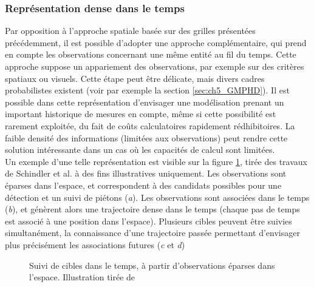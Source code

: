 \subsubsection{Représentation dense dans le temps}
Par opposition à l'approche spatiale basée sur des grilles présentées précédemment, il est possible d'adopter une approche complémentaire, qui prend en compte les observations concernant une même entité au fil du temps. Cette approche suppose un appariement des observations, par exemple sur des critères spatiaux ou visuels. Cette étape peut être délicate, mais divers cadres probabilistes existent (voir par exemple la section \ref{sec:ch5_GMPHD}). Il est possible dans cette représentation d'envisager une modélisation prenant un important historique de mesures en compte, même si cette possibilité est rarement exploitée, du fait de coûts calculatoires rapidement rédhibitoires. La faible densité des informations (limitées aux observations) peut rendre cette solution intéressante dans un cas où les capacités de calcul sont limitées. \\
Un exemple d'une telle représentation est visible sur la figure \ref{fig:ch2_suivi_temps_epars}, tirée des travaux de Schindler et al. \cite{Schindler2010} à des fins illustratives uniquement. Les observations sont éparses dans l'espace, et correspondent à des candidats possibles pour une détection et un suivi de piétons (\textit{a}). Les observations sont associées dans le temps (\textit{b}), et génèrent alors une trajectoire dense dans le temps (chaque pas de temps est associé à une position dans l'espace). Plusieurs cibles peuvent être suivies simultanément, la connaissance d'une trajectoire passée permettant d'envisager plus précisément les associations futures (\textit{c} et \textit{d})

\begin{figure}
	\caption{Suivi de cibles dans le temps, à partir d'observations éparses dans l'espace. Illustration tirée de \cite{Schindler2010}}
	\label{fig:ch2_suivi_temps_epars}
\end{figure}

